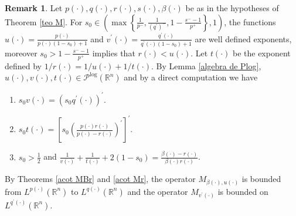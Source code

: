 \documentclass[a4paper,11pt,reqno]{amsart}
\theoremstyle{plain}
\numberwithin{equation}{section}
\theoremstyle{definition}
\newtheorem{remark}[teo]{Remark}
\newcommand{\R}{{\mathbb{R}^n}}
\begin{document}
\begin{remark}\label{remark exp aux}
	Let ${p(\cdot)},{q(\cdot)},{r(\cdot)},{s(\cdot)},{\beta(\cdot)}$ be as in the hypotheses of Theorem \ref{teo M}. For $s_0\in\left( \max\left\{\frac{1}{p^-},\frac{1}{(q^\prime)^-},1-\frac{s^--1}{p^+}\right\},1\right)$, the functions $u(\cdot)=\frac{p(\cdot)}{p(\cdot)(1-s_0)+1}$ and $v^\prime(\cdot)=\frac{q^\prime(\cdot)}{q^\prime(\cdot)(1-s_0)+1}$ are well defined exponents, moreover $s_0>1-\frac{s^--1}{p^+}$ implies that $r(\cdot)<u(\cdot)$. Let $t(\cdot)$ be the exponent defined by $1/r(\cdot)=1/u(\cdot)+1/t(\cdot)$. By Lemma \ref{algebra de Plog}, ${u(\cdot)},{v(\cdot)},t(\cdot)\in\mathcal{P}^{\text{log}}(\R)$ and by a direct computation we have
	\begin{enumerate}
		\item $s_0{v(\cdot)}=(s_0{q^\prime(\cdot)})^\prime$.
		\item  $s_0{t(\cdot)}=\left[s_0\left(\frac{{p(\cdot)}{r(\cdot)}}{{p(\cdot)}-{r(\cdot)}}\right)^\prime\right]^\prime.$
		\item\label{remark3}
		$s_0>\frac{1}{2}$ and $\frac{1}{{v(\cdot)}}+\frac{1}{{t(\cdot)}}+2(1-s_0)=\frac{{\beta(\cdot)}-{r(\cdot)}}{{\beta(\cdot)}{r(\cdot)}}$.
		\end{enumerate}
	By Theorems \ref{acot MBr} and \ref{acot Mr}, the operator $M_{{\beta(\cdot)},{u(\cdot)}}$ is bounded from $L^{p(\cdot)}(\R)$ to $L^{q(\cdot)}(\R)$ and the operator $M_{v^\prime(\cdot)}$ is bounded on $L^{q^\prime(\cdot)}(\R)$.
\end{remark}
\end{document}
